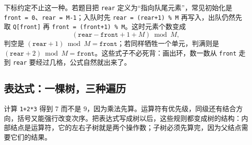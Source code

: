 下标约定不止这一种。若题目把 \texttt{rear} 定义为“指向队尾元素”，常见初始化是 \texttt{front = 0}、\texttt{rear = M-1}；入队时先 \texttt{rear = (rear+1) \% M} 再写入，出队仍然先取 \texttt{Q[front]} 再 \texttt{front = (front+1) \% M}。这时元素个数变成
\[
(\texttt{rear}-\texttt{front}+1+M)\bmod M,
\]
判空是 $(\texttt{rear}+1)\bmod M=\texttt{front}$；若同样牺牲一个单元，判满则是 $(\texttt{rear}+2)\bmod M=\texttt{front}$。这些式子不必死背：画出环，数一数从 \texttt{front} 走到 \texttt{rear} 要经过几格，公式自然就出来了。

\subsection{表达式：一棵树，三种遍历}

计算 \texttt{1+2*3} 得到 $7$ 而不是 $9$，因为乘法先算。运算符有优先级，同级还有结合方向，括号又能强行改变次序。把表达式写成树以后，这些规则都变成树的结构：内部结点是运算符，它的左右子树就是两个操作数；子树必须先算完，因为父结点需要它们的结果。

